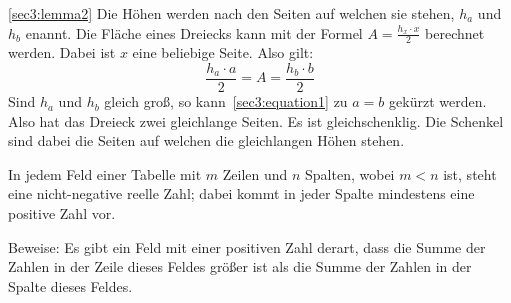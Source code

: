 \documentclass[10pt, a4paper, reqno]{amsart}
\makeatletter
\renewcommand\proofname{Beweis}
\renewenvironment{proof}[1][\proofname]{\par
\pushQED{\qed}%
\normalfont \topsep6\p@\@plus6\p@\relax
\trivlist
\item\relax
{\bfseries#1}\hspace\labelsep\ignorespaces
}{%
\popQED\endtrivlist\@endpefalse
}
\newenvironment{proof_thm}[1]{
\begin{proof}[\proofname~(#1)]}{\end{proof}}
\makeatother
\begin{document}
\begin{proof_thm}{\autoref{sec3:lemma2}}
  Die Höhen werden nach den Seiten auf welchen sie stehen, $h_a$ und $h_b$
  enannt. Die Fläche eines Dreiecks kann mit der Formel $A=\frac{h_x\cdot x}{2}$
  berechnet werden. Dabei ist $x$ eine beliebige Seite. Also gilt:
  \begin{equation}\label{sec3:equation1}
    \frac{h_a\cdot a}{2}=A=\frac{h_b\cdot b}{2}
  \end{equation}
  Sind $h_a$ und $h_b$ gleich groß, so kann~\eqref{sec3:equation1} zu $a=b$
  gekürzt werden. Also hat das Dreieck zwei gleichlange Seiten. Es ist
  gleichschenklig. Die Schenkel sind dabei die Seiten auf welchen die gleichlangen
  Höhen stehen.
\end{proof_thm}

\newpage
\begin{aufgabe}
  In jedem Feld einer Tabelle mit $m$ Zeilen und $n$ Spalten, wobei $m < n$ ist,
  steht eine nicht-negative reelle Zahl; dabei kommt in jeder Spalte mindestens
  eine positive Zahl vor.
  
  Beweise: Es gibt ein Feld mit einer positiven Zahl derart, dass die Summe der
  Zahlen in der Zeile dieses Feldes größer ist als die Summe der Zahlen in der
  Spalte dieses Feldes.
\end{aufgabe}
\end{document}
